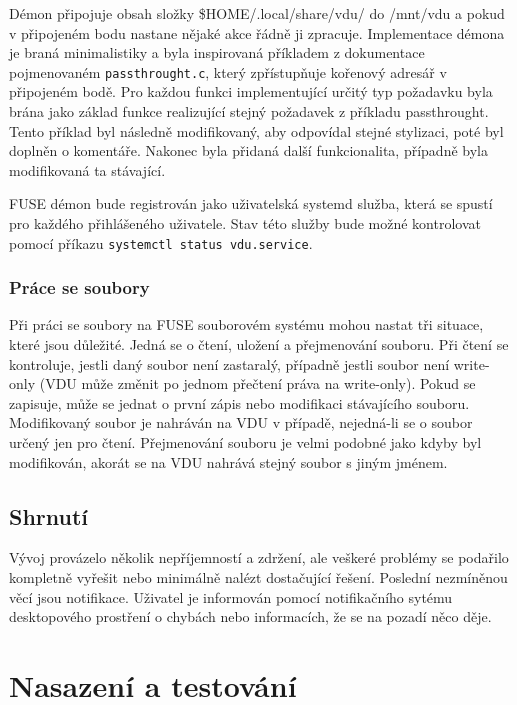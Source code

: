 Démon připojuje obsah složky \$HOME/.local/share/vdu/ do /mnt/vdu a pokud v připojeném bodu nastane nějaké akce řádně ji zpracuje. Implementace démona je braná minimalistiky
a byla inspirovaná příkladem z dokumentace pojmenovaném \texttt{passthrought.c}, který zpřístupňuje kořenový adresář v připojeném bodě. Pro každou funkci implementující
určitý typ požadavku byla brána jako základ funkce realizující stejný požadavek z příkladu passthrought. Tento příklad byl následně modifikovaný, aby odpovídal stejné 
stylizaci, poté byl doplněn o komentáře. Nakonec byla přidaná další funkcionalita, případně byla modifikovaná ta stávající.

FUSE démon bude registrován jako uživatelská systemd služba, která se spustí pro každého přihlášeného uživatele. Stav této služby bude možné kontrolovat pomocí příkazu
\texttt{\mbox{systemctl status vdu.service}}.

\subsection{Práce se soubory}

Při práci se soubory na FUSE souborovém systému mohou nastat tři situace, které jsou důležité. Jedná se o čtení, uložení a přejmenování souboru. Při čtení
se kontroluje, jestli daný soubor není zastaralý, případně jestli soubor není write-only (VDU může změnit po jednom přečtení práva na write-only).
Pokud se zapisuje, může se jednat o první zápis nebo modifikaci stávajícího souboru. Modifikovaný soubor je nahráván na VDU v případě, nejedná-li se o soubor určený
jen pro čtení. Přejmenování souboru je velmi podobné jako kdyby byl modifikován, akorát se na VDU nahrává stejný soubor s jiným jménem.

\section{Shrnutí}
Vývoj provázelo několik nepříjemností a zdržení, ale veškeré problémy se podařilo kompletně vyřešit nebo minimálně nalézt dostačující řešení. Poslední 
nezmíněnou věcí jsou notifikace. Uživatel je informován pomocí notifikačního sytému desktopového prostření o chybách nebo informacích, že se na pozadí něco děje.

\chapter{Nasazení a testování}

